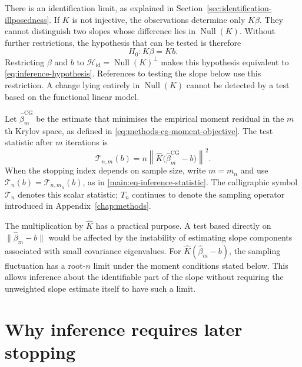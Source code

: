 There is an identification limit, as explained in
Section~\ref{sec:identification-illposedness}.  If $K$ is not injective, the
observations determine only $K\beta$.  They cannot distinguish two slopes
whose difference lies in $\operatorname{Null}(K)$.  Without further
restrictions, the hypothesis that can be tested is therefore
\begin{equation}
    H_0:K\beta=Kb.
    \label{eq:inference-moment-null}
\end{equation}
Restricting $\beta$ and $b$ to
$\mathcal H_{\mathrm{id}}=\operatorname{Null}(K)^\perp$ makes this hypothesis
equivalent to \eqref{eq:inference-hypothesis}.  References to testing the
slope below use this restriction.  A change lying entirely in
$\operatorname{Null}(K)$ cannot be detected by a test based on the functional
linear model.

Let $\widehat\beta_m^{\mathrm{CG}}$ be the estimate that minimises the
empirical moment residual in the $m$th Krylov space, as defined in
\eqref{eq:methods-cg-moment-objective}.  The test statistic after $m$
iterations is
\begin{equation}
    \mathcal T_{n,m}(b)
    =n\left\|
       \widehat K\bigl(\widehat\beta_m^{\mathrm{CG}}-b\bigr)
      \right\|^2.
    \label{eq:inference-finite-m-statistic}
\end{equation}
When the stopping index depends on sample size, write $m=m_n$ and use
$\mathcal T_n(b)=\mathcal T_{n,m_n}(b)$, as in
\eqref{main:eq-inference-statistic}.  The calligraphic symbol $\mathcal T_n$
denotes this scalar statistic; $T_n$ continues to denote the sampling
operator introduced in Appendix~\ref{chap:methods}.

The multiplication by $\widehat K$ has a practical purpose.  A test based
directly on $\|\widehat\beta_m-b\|$ would be affected by the instability of
estimating slope components associated with small covariance eigenvalues.
For $\widehat K(\widehat\beta_m-b)$, the sampling fluctuation has a root-$n$
limit under the moment conditions stated below.  This allows inference about
the identifiable part of the slope without requiring the unweighted slope
estimate itself to have such a limit.

\section{Why inference requires later stopping}
\label{sec:inference-late-stopping}

